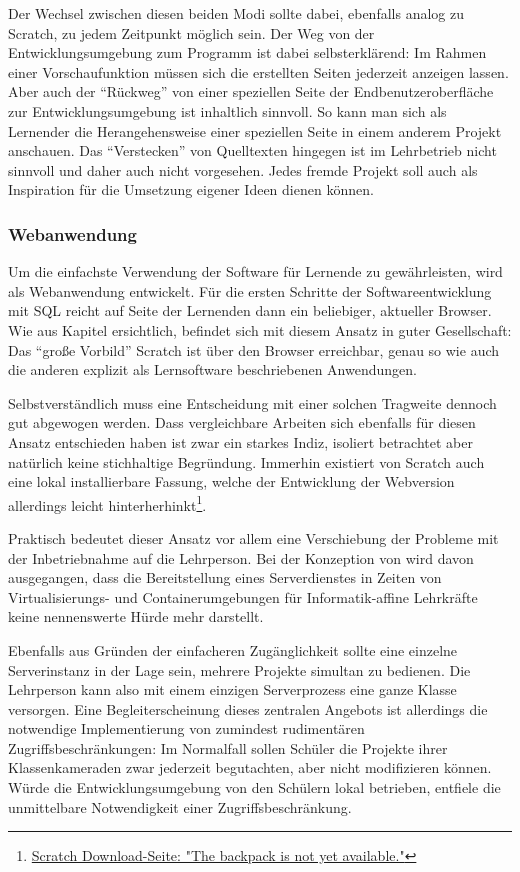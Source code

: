 Der Wechsel zwischen diesen beiden Modi sollte dabei, ebenfalls analog zu Scratch, zu jedem Zeitpunkt möglich sein. Der Weg von der Entwicklungsumgebung zum Programm ist dabei selbsterklärend: Im Rahmen einer Vorschaufunktion müssen sich die erstellten Seiten jederzeit anzeigen lassen. Aber auch der "`Rückweg"' von einer speziellen Seite der Endbenutzeroberfläche zur Entwicklungsumgebung ist inhaltlich sinnvoll. So kann man sich als Lernender die Herangehensweise einer speziellen Seite in einem anderem Projekt anschauen. Das "`Verstecken"' von Quelltexten hingegen ist im Lehrbetrieb nicht sinnvoll und daher auch nicht vorgesehen. Jedes fremde Projekt soll auch als Inspiration für die Umsetzung eigener Ideen dienen können.

\subsubsection{Webanwendung}
\label{sec:req-web-application}

Um die einfachste Verwendung der Software für Lernende zu gewährleisten, wird \idename{} als Webanwendung entwickelt. Für die ersten Schritte der Softwareentwicklung mit SQL reicht auf Seite der Lernenden dann ein beliebiger, aktueller Browser. Wie aus Kapitel  ersichtlich, befindet sich \idename{} mit diesem Ansatz in guter Gesellschaft: Das "`große Vorbild"' Scratch ist über den Browser erreichbar, genau so wie auch die anderen explizit als Lernsoftware beschriebenen Anwendungen.

Selbstverständlich muss eine Entscheidung mit einer solchen Tragweite dennoch gut abgewogen werden. Dass vergleichbare Arbeiten sich ebenfalls für diesen Ansatz entschieden haben ist zwar ein starkes Indiz, isoliert betrachtet aber natürlich keine stichhaltige Begründung. Immerhin existiert von Scratch auch eine lokal installierbare Fassung, welche der Entwicklung der Webversion allerdings leicht hinterherhinkt\footnote{\href{https://scratch.mit.edu/scratch2download/}{Scratch Download-Seite: "The backpack is not yet available."}}.

Praktisch bedeutet dieser Ansatz vor allem eine Verschiebung der Probleme mit der Inbetriebnahme auf die Lehrperson. Bei der Konzeption von \idename{} wird davon ausgegangen, dass die Bereitstellung eines Serverdienstes in Zeiten von Virtualisierungs- und Containerumgebungen für Informatik-affine Lehrkräfte keine nennenswerte Hürde mehr darstellt.

Ebenfalls aus Gründen der einfacheren Zugänglichkeit sollte eine einzelne Serverinstanz in der Lage sein, mehrere Projekte simultan zu bedienen. Die Lehrperson kann also mit einem einzigen Serverprozess eine ganze Klasse versorgen. Eine Begleiterscheinung dieses zentralen Angebots ist allerdings die notwendige Implementierung von zumindest rudimentären Zugriffsbeschränkungen: Im Normalfall sollen Schüler die Projekte ihrer Klassenkameraden zwar jederzeit begutachten, aber nicht modifizieren können. Würde die Entwicklungsumgebung von den Schülern lokal betrieben, entfiele die unmittelbare Notwendigkeit einer Zugriffsbeschränkung.

